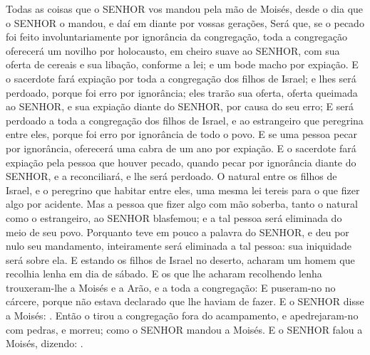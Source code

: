{{{{{  Todas as coisas que o SENHOR vos mandou pela mão de Moisés, desde o dia que o SENHOR o mandou, e daí em diante por vossas gerações,
  Será que, se o pecado foi feito involuntariamente por ignorância da congregação, toda a congregação oferecerá um novilho por holocausto, em cheiro suave ao SENHOR, com sua oferta de cereais e sua libação, conforme a lei; e um bode macho por expiação.
  E o sacerdote fará expiação por toda a congregação dos filhos de Israel; e lhes será perdoado, porque foi erro por ignorância; eles trarão sua oferta, oferta queimada ao SENHOR, e sua expiação diante do SENHOR, por causa do seu erro;
  E será perdoado a toda a congregação dos filhos de Israel, e ao estrangeiro que peregrina entre eles, porque foi erro por ignorância de todo o povo.
  E se uma pessoa pecar por ignorância, oferecerá uma cabra de um ano por expiação.
  E o sacerdote fará expiação pela pessoa que houver pecado, quando pecar por ignorância diante do SENHOR, e a reconciliará, e lhe será perdoado.
  O natural entre os filhos de Israel, e o peregrino que habitar entre eles, uma mesma lei tereis para o que fizer algo por acidente.
  Mas a pessoa que fizer algo com mão soberba, tanto o natural como o estrangeiro, ao SENHOR blasfemou; e a tal pessoa será eliminada do meio de seu povo.
  Porquanto teve em pouco a palavra do SENHOR, e deu por nulo seu mandamento, inteiramente será eliminada a tal pessoa: sua iniquidade será sobre ela}}}}.
  E estando os filhos de Israel no deserto, acharam um homem que recolhia lenha em dia de sábado.
  E os que lhe acharam recolhendo lenha trouxeram-lhe a Moisés e a Arão, e a toda a congregação:
  E puseram-no no cárcere, porque não estava declarado que lhe haviam de fazer.
  E o SENHOR disse a Moisés: .
  Então o tirou a congregação fora do acampamento, e apedrejaram-no com pedras, e morreu; como o SENHOR mandou a Moisés.
  E o SENHOR falou a Moisés, dizendo:
  .
\par }

